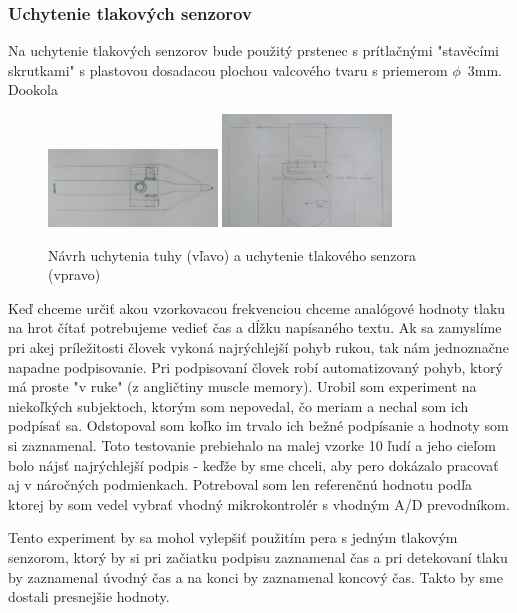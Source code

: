 \subsubsection*{Uchytenie tlakových senzorov}

Na uchytenie tlakových senzorov bude použitý prstenec s prítlačnými "stavěcími skrutkami" s plastovou dosadacou plochou valcového tvaru s priemerom $\phi$~3mm. Dookola 

\begin{figure}[hbt]
	\centering
	\includegraphics[width=0.4\textwidth]{obrazky-figures/umiestnenie_tlakovych_senzorov.png}
	\includegraphics[width=0.4\textwidth]{obrazky-figures/uchytenie.png}
	\caption{Návrh uchytenia tuhy (vľavo) a uchytenie tlakového senzora (vpravo)}
	\label{Uchytenie tuhy}
\end{figure}

Keď chceme určiť akou vzorkovacou frekvenciou chceme analógové hodnoty tlaku na hrot čítať potrebujeme vedieť čas a dĺžku napísaného textu. Ak sa zamyslíme pri akej príležitosti človek vykoná najrýchlejší pohyb rukou, tak nám jednoznačne napadne podpisovanie. Pri podpisovaní človek robí automatizovaný pohyb, ktorý má proste "v ruke" (z angličtiny muscle memory). Urobil som experiment na niekoľkých subjektoch, ktorým som nepovedal, čo meriam a nechal som ich podpísať sa. Odstopoval som koľko im trvalo ich bežné podpísanie a hodnoty som si zaznamenal. Toto testovanie prebiehalo na malej vzorke 10 ľudí a jeho cieľom bolo nájsť najrýchlejší podpis - keďže by sme chceli, aby pero dokázalo pracovať aj v náročných podmienkach. Potreboval som len referenčnú hodnotu podľa ktorej by som vedel vybrať vhodný mikrokontrolér s vhodným A/D prevodníkom. 

Tento experiment by sa mohol vylepšiť použitím pera s jedným tlakovým senzorom, ktorý by si pri začiatku podpisu zaznamenal čas a pri detekovaní tlaku by zaznamenal úvodný čas a na konci by zaznamenal koncový čas. Takto by sme dostali presnejšie hodnoty.


